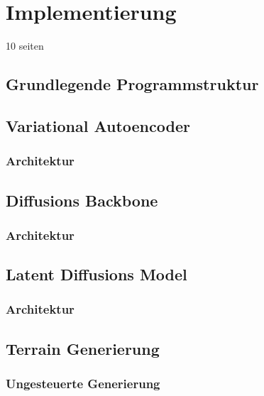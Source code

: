 \chapter{Implementierung}
10 seiten

\section {Grundlegende Programmstruktur}

\section {Variational Autoencoder}

\subsection{Architektur}

\section {Diffusions Backbone}

\subsection{Architektur}


\section {Latent Diffusions Model}

\subsection{Architektur}


\section {Terrain Generierung}
\subsection {Ungesteuerte Generierung}
